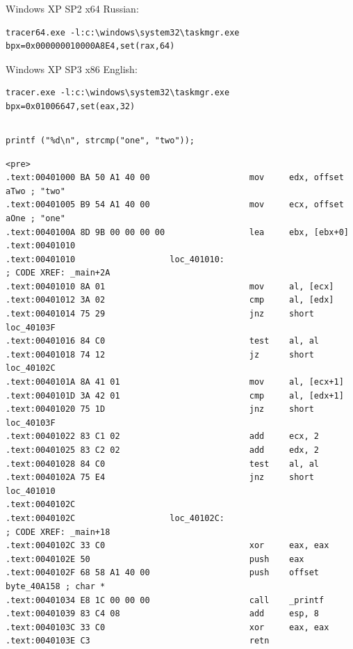  Windows XP SP2 x64 Russian:

\begin{lstlisting}
tracer64.exe -l:c:\windows\system32\taskmgr.exe bpx=0x000000010000A8E4,set(rax,64)
\end{lstlisting}

 Windows XP SP3 x86 English:

\begin{lstlisting}
tracer.exe -l:c:\windows\system32\taskmgr.exe bpx=0x01006647,set(eax,32)
\end{lstlisting}

\subsection{}


\begin{lstlisting}
printf ("%d\n", strcmp("one", "two"));
\end{lstlisting}


\begin{lstlisting}
<pre>
.text:00401000 BA 50 A1 40 00                    mov     edx, offset aTwo ; "two"
.text:00401005 B9 54 A1 40 00                    mov     ecx, offset aOne ; "one"
.text:0040100A 8D 9B 00 00 00 00                 lea     ebx, [ebx+0]
.text:00401010
.text:00401010                   loc_401010:                             ; CODE XREF: _main+2A
.text:00401010 8A 01                             mov     al, [ecx]
.text:00401012 3A 02                             cmp     al, [edx]
.text:00401014 75 29                             jnz     short loc_40103F
.text:00401016 84 C0                             test    al, al
.text:00401018 74 12                             jz      short loc_40102C
.text:0040101A 8A 41 01                          mov     al, [ecx+1]
.text:0040101D 3A 42 01                          cmp     al, [edx+1]
.text:00401020 75 1D                             jnz     short loc_40103F
.text:00401022 83 C1 02                          add     ecx, 2
.text:00401025 83 C2 02                          add     edx, 2
.text:00401028 84 C0                             test    al, al
.text:0040102A 75 E4                             jnz     short loc_401010
.text:0040102C
.text:0040102C                   loc_40102C:                             ; CODE XREF: _main+18
.text:0040102C 33 C0                             xor     eax, eax
.text:0040102E 50                                push    eax
.text:0040102F 68 58 A1 40 00                    push    offset byte_40A158 ; char *
.text:00401034 E8 1C 00 00 00                    call    _printf
.text:00401039 83 C4 08                          add     esp, 8
.text:0040103C 33 C0                             xor     eax, eax
.text:0040103E C3                                retn
\end{lstlisting}

